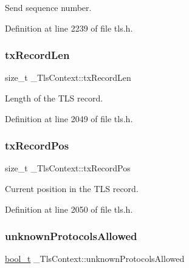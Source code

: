Send sequence number. 



Definition at line 2239 of file tls.\+h.

\mbox{\label{struct__TlsContext_a70252aa415a0deabcbf4826949e78201}} 
\subsubsection{\texorpdfstring{tx\+Record\+Len}{txRecordLen}}
{\footnotesize\ttfamily size\+\_\+t \+\_\+\+Tls\+Context\+::tx\+Record\+Len}



Length of the T\+LS record. 



Definition at line 2049 of file tls.\+h.

\mbox{\label{struct__TlsContext_ab7ad234fd1e14281299555df13bf787c}} 
\subsubsection{\texorpdfstring{tx\+Record\+Pos}{txRecordPos}}
{\footnotesize\ttfamily size\+\_\+t \+\_\+\+Tls\+Context\+::tx\+Record\+Pos}



Current position in the T\+LS record. 



Definition at line 2050 of file tls.\+h.

\mbox{\label{struct__TlsContext_acb254759769c72f12bc906dca4532ef4}} 
\subsubsection{\texorpdfstring{unknown\+Protocols\+Allowed}{unknownProtocolsAllowed}}
{\footnotesize\ttfamily \hyperlink{compiler__port_8h_a812d16e5494522586b3784e55d479912}{bool\+\_\+t} \+\_\+\+Tls\+Context\+::unknown\+Protocols\+Allowed}



